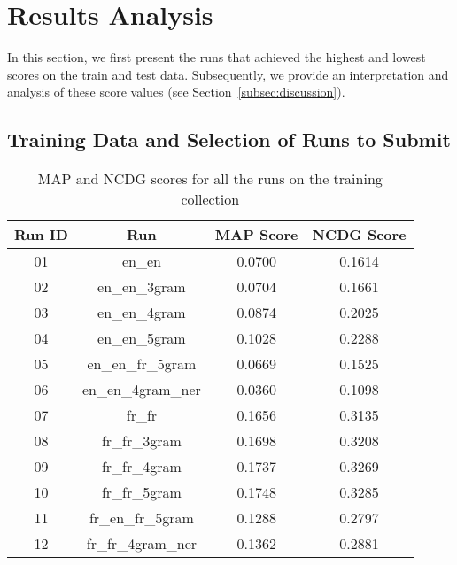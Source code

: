 \newpage
\section{Results Analysis}
\label{sec:results}

In this section, we first present the runs that achieved the highest and lowest scores on the train and test data.
Subsequently, we provide an interpretation and analysis of these score values (see Section~\ref{subsec:discussion}).

\subsection{Training Data and Selection of Runs to Submit}\label{subsec:runs_selection}

\begin{table}[h!]
    \begin{center}
        \caption{MAP and NCDG scores for all the runs on the training collection}
        \label{tab:all_scores}
        \begin{tabular}{|c|c||c|c|}
            \hline
            \textbf{Run ID} & \textbf{Run} & \textbf{MAP Score} & \textbf{NCDG Score}\\
            \hline\hline
            01 & en\_en & \cellcolor{red!30!white}0.0700 & \cellcolor{red!30!white}0.1614 \\
            \hline
            02 & en\_en\_3gram & 0.0704 & 0.1661 \\
            \hline
            03 & en\_en\_4gram & 0.0874 & 0.2025 \\
            \hline
            04 & en\_en\_5gram & 0.1028 & 0.2288 \\
            \hline
            05 & en\_en\_fr\_5gram & \cellcolor{red!60!white}0.0669 & \cellcolor{red!60!white}0.1525 \\
            \hline
            06 & en\_en\_4gram\_ner & \cellcolor{red}0.0360 & \cellcolor{red}0.1098 \\
            \hline
            07 & fr\_fr & 0.1656 & 0.3135 \\
            \hline
            08 & fr\_fr\_3gram & \cellcolor{green!30!white}0.1698 & \cellcolor{green!30!white}0.3208 \\
            \hline
            09 & fr\_fr\_4gram & \cellcolor{green!60!white}0.1737 & \cellcolor{green!60!white}0.3269 \\
            \hline
            10 & fr\_fr\_5gram & \cellcolor{green}0.1748 & \cellcolor{green}0.3285 \\
            \hline
            11 & fr\_en\_fr\_5gram & 0.1288 & 0.2797 \\
            \hline
            12 & fr\_fr\_4gram\_ner & 0.1362 & 0.2881 \\
            \hline
        \end{tabular}
    \end{center}
\end{table}

